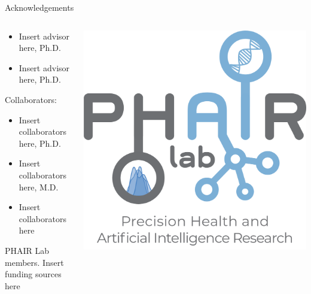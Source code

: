 \documentclass[9pt,aspectratio=169]{beamer}
\begin{document}
\begin{frame}{Acknowledgements}
\begin{columns}[T]
\begin{column}{.5\textwidth}
    \begin{itemize}\setlength\itemsep{0.1em}
        \item Insert advisor here, Ph.D.
        \item Insert advisor here, Ph.D.
    \end{itemize}\leavevmode\newline
    Collaborators:
        \begin{itemize}\setlength\itemsep{0.1em}
        \item Insert collaborators here, Ph.D.
        \item Insert collaborators here, M.D.
        \item Insert collaborators here
        \end{itemize}
    \leavevmode\newline
    PHAIR Lab members.\leavevmode\newline
    Insert funding sources here
\end{column}
\begin{column}{.5\textwidth}
    \begin{center}
        \vspace{-4mm}
        \includegraphics[width=.8\linewidth]{images/kosoroklablogo_withtext.png}
    \end{center}
\end{column}%
\end{columns}
\end{frame}

\appendix
\end{document}
